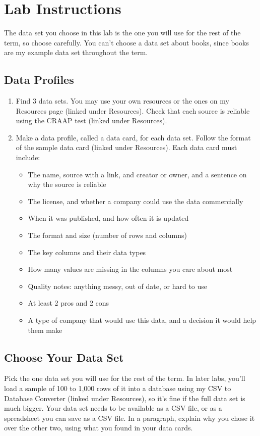 \documentclass[12pt]{article}
\begin{document}
\section*{Lab Instructions}
The data set you choose in this lab is the one you will use for the rest of the term, so choose carefully. You can't choose a data set about books, since books are my example data set throughout the term.

\subsection*{Data Profiles}
\begin{enumerate}
    \item Find 3 data sets. You may use your own resources or the ones on my Resources page (linked under Resources). Check that each source is reliable using the CRAAP test (linked under Resources).
    \item Make a data profile, called a data card, for each data set. Follow the format of the sample data card (linked under Resources). Each data card must include:
    \begin{itemize}
        \item The name, source with a link, and creator or owner, and a sentence on why the source is reliable
        \item The license, and whether a company could use the data commercially
        \item When it was published, and how often it is updated
        \item The format and size (number of rows and columns)
        \item The key columns and their data types
        \item How many values are missing in the columns you care about most
        \item Quality notes: anything messy, out of date, or hard to use
        \item At least 2 pros and 2 cons
        \item A type of company that would use this data, and a decision it would help them make
    \end{itemize}
\end{enumerate}

\subsection*{Choose Your Data Set}
Pick the one data set you will use for the rest of the term. In later labs, you'll load a sample of 100 to 1,000 rows of it into a database using my CSV to Database Converter (linked under Resources), so it's fine if the full data set is much bigger. Your data set needs to be available as a CSV file, or as a spreadsheet you can save as a CSV file. In a paragraph, explain why you chose it over the other two, using what you found in your data cards.
\end{document}
